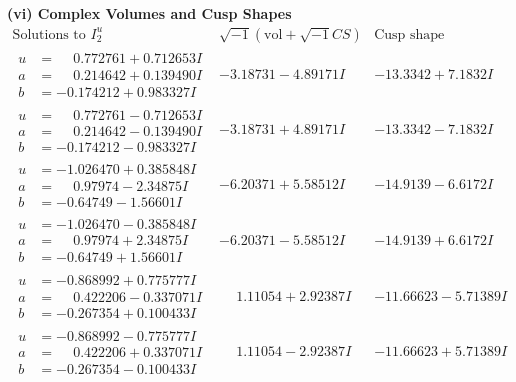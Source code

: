 \documentclass[1p]{elsarticle_modified}
\theoremstyle{definition}
\newcommand{\I}{\sqrt{-1}}
\begin{document}
\newpage\flushleft \textbf{(vi) Complex Volumes and Cusp Shapes}
$$\begin{array}{c|c|c}  
\text{Solutions to }I^u_{2}& \I (\text{vol} + \sqrt{-1}CS) & \text{Cusp shape}\\
 \hline 
\begin{aligned}
u &= \phantom{-}0.772761 + 0.712653 I \\
a &= \phantom{-}0.214642 + 0.139490 I \\
b &= -0.174212 + 0.983327 I\end{aligned}
 & -3.18731 - 4.89171 I & -13.3342 + 7.1832 I \\ \hline\begin{aligned}
u &= \phantom{-}0.772761 - 0.712653 I \\
a &= \phantom{-}0.214642 - 0.139490 I \\
b &= -0.174212 - 0.983327 I\end{aligned}
 & -3.18731 + 4.89171 I & -13.3342 - 7.1832 I \\ \hline\begin{aligned}
u &= -1.026470 + 0.385848 I \\
a &= \phantom{-}0.97974 - 2.34875 I \\
b &= -0.64749 - 1.56601 I\end{aligned}
 & -6.20371 + 5.58512 I & -14.9139 - 6.6172 I \\ \hline\begin{aligned}
u &= -1.026470 - 0.385848 I \\
a &= \phantom{-}0.97974 + 2.34875 I \\
b &= -0.64749 + 1.56601 I\end{aligned}
 & -6.20371 - 5.58512 I & -14.9139 + 6.6172 I \\ \hline\begin{aligned}
u &= -0.868992 + 0.775777 I \\
a &= \phantom{-}0.422206 - 0.337071 I \\
b &= -0.267354 + 0.100433 I\end{aligned}
 & \phantom{-}1.11054 + 2.92387 I & -11.66623 - 5.71389 I \\ \hline\begin{aligned}
u &= -0.868992 - 0.775777 I \\
a &= \phantom{-}0.422206 + 0.337071 I \\
b &= -0.267354 - 0.100433 I\end{aligned}
 & \phantom{-}1.11054 - 2.92387 I & -11.66623 + 5.71389 I \\ \hline\begin{aligned}

\end{aligned}
\end{array}$$
\end{document}
